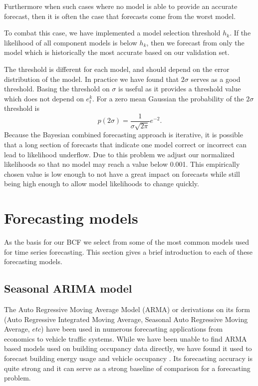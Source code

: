 \documentclass{acm_proc_article-sp}
\begin{document}
Furthermore when such cases where no model is able to provide an accurate forecast, then it is often the case that forecasts come from the worst model.  

To combat this case, we have implemented a model selection threshold $h_{k}$.  If the likelihood of all component models is below $h_{k}$, then we forecast from only the model which is historically the most accurate based on our validation set.  

The threshold is different for each model, and should depend on the error distribution of the model.  In practice we have found that $2\sigma$ serves as a good threshold.  Basing the threshold on $\sigma$ is useful as it provides a threshold value which does not depend on $e^{k}_{t}$.  For a zero mean Gaussian the probability of the $2\sigma$ threshold is
\begin{equation}
p(2\sigma) = \frac{1}{\sigma\sqrt{2\pi}}e^{-2}.
\end{equation}
Because the Bayesian combined forecasting approach is iterative, it is possible that a long section of forecasts that indicate one model correct or incorrect can lead to likelihood underflow.  Due to this problem we adjust our normalized likelihoods so that no model may reach a value below 0.001.  This empirically chosen value is low enough to not have a great impact on forecasts while still being high enough to allow model likelihoods to change quickly.

\section{Forecasting models}
As the basis for our BCF we select from some of the most common models used for time series forecasting.  This section gives a brief introduction to each of these forecasting models. 

\subsection{Seasonal ARIMA model}
The Auto Regressive Moving Average Model (ARMA) or derivations on its form (Auto Regressive Integrated Moving Average, Seasonal Auto Regressive Moving Average, $etc$) have been used in numerous forecasting applications from economics to vehicle traffic systems.  While we have been unable to find ARMA based models used on building occupancy data directly, we have found it used to forecast building energy usage and vehicle occupancy \cite{Williams2003, Hong2011, Newsham2010}.  Its forecasting accuracy is quite strong and it can serve as a strong baseline of comparison for a forecasting problem.  
\end{document}
